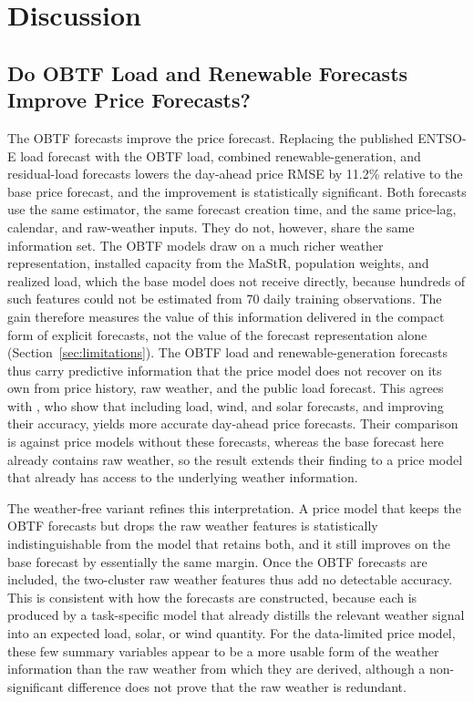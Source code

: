 \section{Discussion}
\label{sec:discussion}

\subsection{Do OBTF Load and Renewable Forecasts Improve Price Forecasts?}
\label{sec:discussion_rq2}

The OBTF forecasts improve the price forecast. Replacing the
published \mbox{ENTSO-E} load forecast with the OBTF load, combined
renewable-generation, and residual-load forecasts lowers the day-ahead price
RMSE by 11.2\% relative to the base price forecast, and the improvement is
statistically significant. Both forecasts use the same estimator, the same
forecast creation time, and the same price-lag, calendar, and raw-weather
inputs. They do not, however, share the same information set. The OBTF models
draw on a much richer weather representation, installed capacity from the
MaStR, population weights, and realized load, which the base
model does not receive directly, because hundreds of such features could not be
estimated from 70 daily training observations. The gain therefore measures the
value of this information delivered in the compact form of explicit forecasts,
not the value of the forecast representation alone
(Section~\ref{sec:limitations}).
The OBTF load and renewable-generation forecasts thus carry
predictive information that the price model does not recover on its own from
price history, raw weather, and the public load forecast.
This agrees with \textcite{maciejowska2021enhancing}, who show that including
load, wind, and solar forecasts, and improving their accuracy, yields more
accurate day-ahead price forecasts. Their comparison is against price models
without these forecasts, whereas the base forecast here already contains raw
weather, so the result extends their finding to a price model that already has
access to the underlying weather information.

The weather-free variant refines this interpretation. A price model that keeps
the OBTF forecasts but drops the raw weather features is statistically
indistinguishable from the model that retains both, and it still improves on the
base forecast by essentially the same margin. Once the OBTF forecasts
are included, the two-cluster raw weather features thus add no detectable
accuracy. This is consistent with how the forecasts are constructed, because
each is produced by a task-specific model that already distills the relevant
weather signal into an expected load, solar, or wind quantity. For the
data-limited price model, these few summary variables appear to be a more usable
form of the weather information than the raw weather from which they are
derived, although a non-significant difference does not prove that the raw
weather is redundant.

